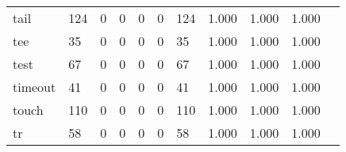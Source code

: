 \begin{longtable}{lp{1.20cm}p{1.20cm}p{1.20cm}p{1.20cm}p{1.20cm}p{1.20cm}p{1.20cm}p{1.20cm}p{1.20cm}p{1.20cm}}
tail      &                                   124 &                                                  0 &                                                  0 &                                                  0 &                                                  0 &                                                124 &                                         1.000 &                                              1.000 &                                              1.000 \\
tee       &                                    35 &                                                  0 &                                                  0 &                                                  0 &                                                  0 &                                                 35 &                                         1.000 &                                              1.000 &                                              1.000 \\
test      &                                    67 &                                                  0 &                                                  0 &                                                  0 &                                                  0 &                                                 67 &                                         1.000 &                                              1.000 &                                              1.000 \\
timeout   &                                    41 &                                                  0 &                                                  0 &                                                  0 &                                                  0 &                                                 41 &                                         1.000 &                                              1.000 &                                              1.000 \\
touch     &                                   110 &                                                  0 &                                                  0 &                                                  0 &                                                  0 &                                                110 &                                         1.000 &                                              1.000 &                                              1.000 \\
tr        &                                    58 &                                                  0 &                                                  0 &                                                  0 &                                                  0 &                                                 58 &                                         1.000 &                                              1.000 &                                              1.000 \\

\end{longtable}
